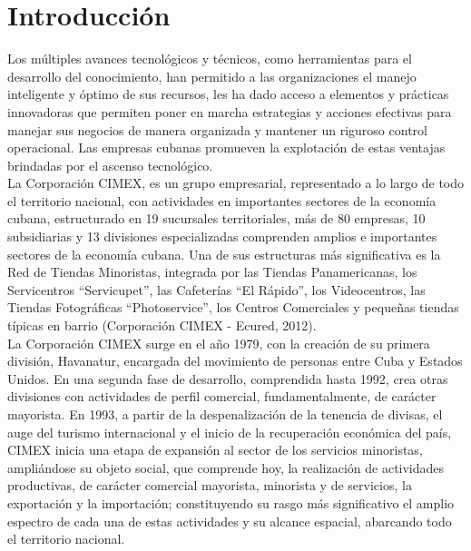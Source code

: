 \chapter*{Introducción}\label{chapter:introduction}


Los múltiples avances tecnológicos y técnicos, como herramientas para el desarrollo del conocimiento, han permitido a las organizaciones el manejo inteligente y óptimo de sus recursos, les ha dado acceso a elementos y prácticas innovadoras que permiten poner en marcha estrategias y acciones efectivas para manejar sus negocios de manera organizada y mantener un riguroso control operacional. Las empresas cubanas promueven la explotación de estas ventajas brindadas por el ascenso tecnológico.\\

La Corporación CIMEX, es un grupo empresarial, representado  a lo largo de todo el territorio nacional, con actividades en importantes sectores de la economía cubana, estructurado en 19 sucursales territoriales, más de 80 empresas, 10 subsidiarias y 13 divisiones especializadas comprenden amplios e importantes sectores de la economía cubana. Una de sus estructuras más significativa es la Red de Tiendas Minoristas, integrada por las Tiendas Panamericanas, los Servicentros “Servicupet”, las Cafeterías “El Rápido”, los Videocentros, las Tiendas Fotográficas “Photoservice”, los Centros Comerciales y pequeñas tiendas típicas en barrio (Corporación CIMEX - Ecured, 2012).\\

La Corporación CIMEX surge en el año 1979, con la creación de su primera división, Havanatur, encargada del movimiento de personas entre Cuba y Estados Unidos. En una segunda fase de desarrollo, comprendida  hasta 1992, crea otras divisiones con actividades de perfil comercial, fundamentalmente, de carácter mayorista. En 1993, a partir de la despenalización de la tenencia de divisas, el auge del turismo internacional y el inicio de la recuperación económica del país, CIMEX inicia una etapa de expansión al sector de los servicios minoristas, ampliándose su objeto social, que comprende hoy,  la realización de actividades productivas, de carácter comercial mayorista, minorista y de servicios, la exportación y la importación; constituyendo su rasgo más significativo el amplio espectro de cada una de estas actividades y su  alcance espacial, abarcando todo el territorio nacional.\\

